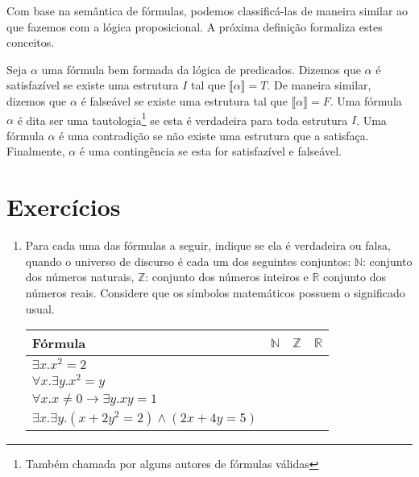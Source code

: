 Com base na semântica de fórmulas, podemos classificá-las de maneira
similar ao que fazemos com a lógica proposicional. A próxima definição
formaliza estes conceitos.
\begin{Definition}
Seja $\alpha$ uma fórmula bem formada da lógica de predicados. Dizemos
que $\alpha$ é satisfazível se existe uma estrutura $I$ tal que
$\llbracket \alpha \rrbracket = T$. De maneira similar, dizemos que
$\alpha$ é falseável se existe uma estrutura tal que $\llbracket \alpha
\rrbracket = F$. Uma fórmula $\alpha$ é dita ser uma tautologia\footnote{Também
chamada por alguns autores de fórmulas válidas} se esta é verdadeira
para toda estrutura $I$. Uma fórmula $\alpha$ é uma contradição se não
existe uma estrutura que a satisfaça. Finalmente, $\alpha$ é uma
contingência se esta for satisfazível e falseável.
\end{Definition}

\section{Exercícios}

\begin{enumerate}

   \item Para cada uma das f\'ormulas a seguir, indique se ela \'e verdadeira ou falsa,
         quando o universo de discurso \'e cada um dos seguintes conjuntos: $\mathbb{N}$: conjunto
         dos n\'umeros naturais, $\mathbb{Z}$: conjunto dos n\'umeros inteiros e $\mathbb{R}$ conjunto
         dos n\'umeros reais. Considere que os símbolos matemáticos
         possuem o significado usual.
         \begin{center}
         \begin{tabular}{|l|c|c|c|}
             \hline
             F\'ormula & $\mathbb{N}$ & $\mathbb{Z}$ & $\mathbb{R}$ \\ \hline
             $\exists x. x^2 = 2$ & & &\\ \hline
             $\forall x. \exists y. x^2 = y$ & & & \\ \hline
             $\forall x. x\neq 0 \rightarrow \exists y. xy = 1$ & & & \\ \hline
             $\exists x. \exists y. (x + 2y^2 = 2) \land (2x + 4y = 5)$ & & & \\
             \hline
         \end{tabular}
         \end{center}
\end{enumerate}

